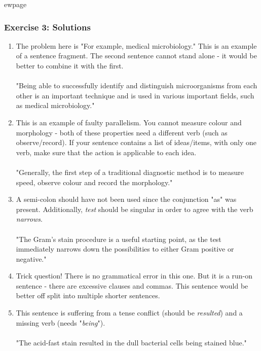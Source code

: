 \documentclass{article}
\begin{document}
ewpage 
\subsubsection*{Exercise 3: Solutions}

\begin{enumerate}
\item The problem here is "For example, medical microbiology." This is an example of a sentence fragment. The second sentence cannot stand alone - it would be better to combine it with the first.
\paragraph{} "Being able to successfully identify and distinguish microorganisms from each other is an important technique and is used in various important fields, such as medical microbiology."

\item This is an example of faulty parallelism. You cannot measure colour and morphology - both of these properties need a different verb (such as observe/record). If your sentence contains a list of ideas/items, with only one verb, make sure that the action is applicable to each idea. 
\paragraph{} "Generally, the first step of a traditional diagnostic method is to measure speed, observe colour and record the morphology."

\item A semi-colon should have not been used since the conjunction "as" was present. Additionally, \textit{test} should be singular in order to agree with the verb \textit{narrows}.
\paragraph{} "The Gram’s stain procedure is a useful starting point, as the test immediately narrows down the possibilities to either Gram positive or negative."

\item Trick question! There is no grammatical error in this one. But it is a run-on sentence - there are excessive clauses and commas. This sentence would be better off split into multiple shorter sentences.
\item This sentence is suffering from a tense conflict (should be \textit{resulted}) and a missing verb (needs "\textit{being}").
\paragraph{} "The acid-fast stain resulted in the dull bacterial cells being stained blue." 
\end{enumerate}
\end{document}
